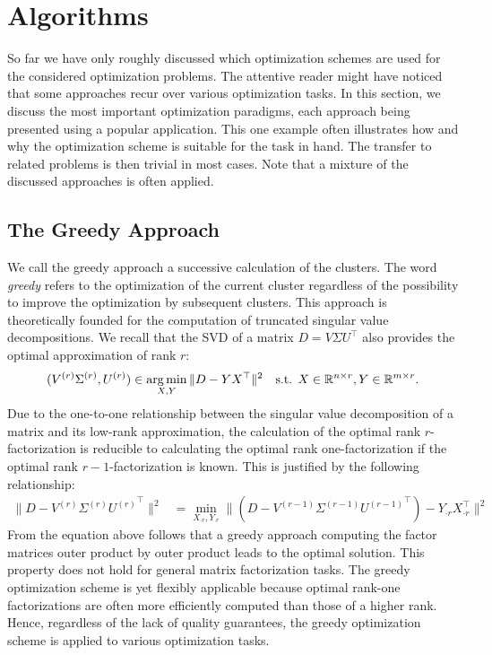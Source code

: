 \chapter{Algorithms}
So far we have only roughly discussed which optimization schemes are used for the considered optimization problems. The attentive reader might have noticed that some approaches recur over various optimization tasks. In this section, we discuss the most important optimization paradigms, each approach being presented using a popular application. This one example often illustrates how and why the optimization scheme is suitable for the task in hand. The transfer to related problems is then trivial in most cases. Note that a mixture of the discussed approaches is often applied.
\section{The Greedy Approach}\label{sec:ZS:GreedyApproach}
We call the greedy approach a successive calculation of the clusters. The word \emph{greedy} refers to the optimization of the current cluster regardless of the possibility to improve the optimization by subsequent clusters. This approach is theoretically founded for the computation of truncated singular value decompositions. 
We recall that the SVD of a matrix $D=V\Sigma U^\top$ also provides the optimal approximation of rank $r$:
\begin{align*}
     (V^{(r)}\Sigma^{(r)},U^{(r)})&\in\operatorname*{arg\,min}_{X,Y}\|D-YX^\top\|^2 &\text{s.t. } X\in\mathbb{R}^{n\times r}, Y\in\mathbb{R}^{m\times r}.
\end{align*}
Due to the one-to-one relationship between the singular value decomposition of a matrix and its low-rank approximation, the calculation of the optimal rank $r$-factorization is reducible to calculating the optimal rank one-factorization if the optimal rank $r-1$-factorization is known. This is justified by the following relationship:  
\begin{align*}
\|D-V^{(r)}\Sigma^{(r)}{U^{(r)}}^\top\|^2
     &= \min_{X_{\cdot r},Y_{\cdot r}} \|(D-V^{(r-1)}\Sigma^{(r-1)}{U^{(r-1)}}^\top)-Y_{\cdot r}X_{\cdot r}^\top\|^2
\end{align*}
From the equation above follows that a greedy approach computing the factor matrices outer product by outer product leads to the optimal solution. This property does not hold for general matrix factorization tasks. The greedy optimization scheme is yet flexibly applicable because optimal rank-one factorizations are often more efficiently computed than those of a higher rank. Hence, regardless of the lack  of quality guarantees, the greedy optimization scheme is applied to various optimization tasks.
